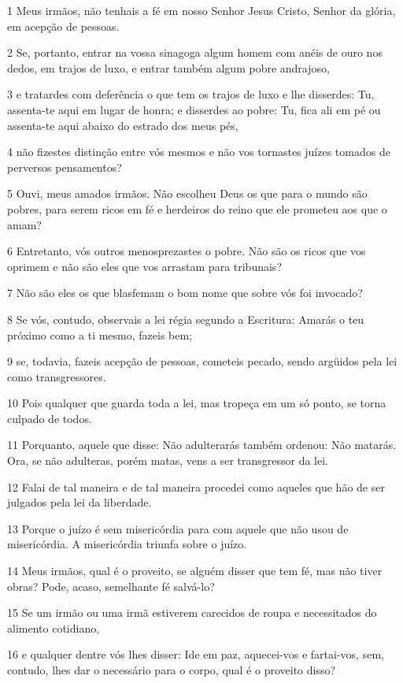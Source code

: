 \par 1 Meus irmãos, não tenhais a fé em nosso Senhor Jesus Cristo, Senhor da glória, em acepção de pessoas.
\par 2 Se, portanto, entrar na vossa sinagoga algum homem com anéis de ouro nos dedos, em trajos de luxo, e entrar também algum pobre andrajoso,
\par 3 e tratardes com deferência o que tem os trajos de luxo e lhe disserdes: Tu, assenta-te aqui em lugar de honra; e disserdes ao pobre: Tu, fica ali em pé ou assenta-te aqui abaixo do estrado dos meus pés,
\par 4 não fizestes distinção entre vós mesmos e não vos tornastes juízes tomados de perversos pensamentos?
\par 5 Ouvi, meus amados irmãos. Não escolheu Deus os que para o mundo são pobres, para serem ricos em fé e herdeiros do reino que ele prometeu aos que o amam?
\par 6 Entretanto, vós outros menosprezastes o pobre. Não são os ricos que vos oprimem e não são eles que vos arrastam para tribunais?
\par 7 Não são eles os que blasfemam o bom nome que sobre vós foi invocado?
\par 8 Se vós, contudo, observais a lei régia segundo a Escritura: Amarás o teu próximo como a ti mesmo, fazeis bem;
\par 9 se, todavia, fazeis acepção de pessoas, cometeis pecado, sendo argüidos pela lei como transgressores.
\par 10 Pois qualquer que guarda toda a lei, mas tropeça em um só ponto, se torna culpado de todos.
\par 11 Porquanto, aquele que disse: Não adulterarás também ordenou: Não matarás. Ora, se não adulteras, porém matas, vens a ser transgressor da lei.
\par 12 Falai de tal maneira e de tal maneira procedei como aqueles que hão de ser julgados pela lei da liberdade.
\par 13 Porque o juízo é sem misericórdia para com aquele que não usou de misericórdia. A misericórdia triunfa sobre o juízo.
\par 14 Meus irmãos, qual é o proveito, se alguém disser que tem fé, mas não tiver obras? Pode, acaso, semelhante fé salvá-lo?
\par 15 Se um irmão ou uma irmã estiverem carecidos de roupa e necessitados do alimento cotidiano,
\par 16 e qualquer dentre vós lhes disser: Ide em paz, aquecei-vos e fartai-vos, sem, contudo, lhes dar o necessário para o corpo, qual é o proveito disso?
